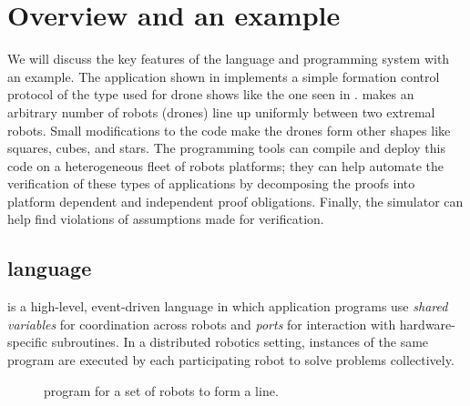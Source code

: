 \section{Overview and an example}
\label{sec:overview}

\newcommand{\Motion}{\emph{Motion}\xspace}

We will discuss the key features of the \lgname language and programming system with an example.
The \lgname application \LineForm shown in  implements a simple formation control protocol of the type  used for drone shows like the one seen in .
\LineForm makes an arbitrary number of robots (drones) line up uniformly between two extremal robots.
Small modifications to the code make the drones form other shapes like squares, cubes, and stars.
The \lgname programming tools can compile and deploy this code on a heterogeneous fleet of robots platforms; they can help automate the verification of these types of applications by decomposing the proofs into platform dependent and independent proof obligations. Finally, the \lgname simulator can help find violations of assumptions made for verification.

\subsection{\lgname language}
\label{sec:koord-language}
\lgname is a high-level, event-driven language in which application programs use \emph{shared variables} for coordination across robots
and \emph{ports} for interaction with hardware-specific subroutines.
In a distributed robotics setting, instances of the same \lgname program are executed by each participating robot to solve problems collectively.
\begin{figure}[h!]
            \captionsetup{font=scriptsize}
    \begin{mdframed}
    [innertopmargin=0pt,innerbottommargin=0pt]
    {
        
    }
    {
        
    }\end{mdframed}
    \caption{\lgname program \LineForm for a set of robots to form a line.}
    \label{fig:lineform}
\end{figure}
\

